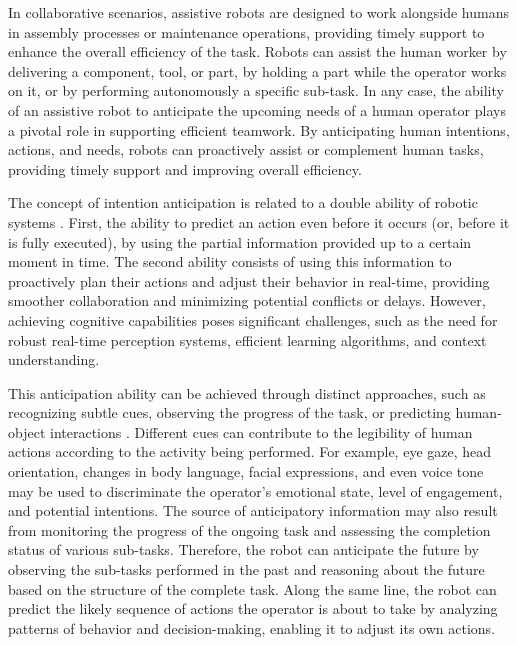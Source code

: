 In collaborative scenarios, assistive robots are designed to work alongside humans in assembly processes or maintenance operations, providing timely support to enhance the overall efficiency of the task. Robots can assist the human worker by delivering a component, tool, or part, by holding a part while the operator works on it, or by performing autonomously a specific sub-task. In any case, the ability of an assistive robot to anticipate the upcoming needs of a human operator plays a pivotal role in supporting efficient teamwork. By anticipating human intentions, actions, and needs, robots can proactively assist or complement human tasks, providing timely support and improving overall efficiency. 

The concept of intention anticipation is related to a double ability of robotic systems \cite{Hoffman2007,Williams2009,Huang2016,Duarte2018}. First, the ability to predict an action even before it occurs (or, before it is fully executed), by using the partial information provided up to a certain moment in time. The second ability consists of using this information to proactively plan their actions and adjust their behavior in real-time, providing smoother collaboration and minimizing potential conflicts or delays. However, achieving cognitive capabilities poses significant challenges, such as the need for robust real-time perception systems, efficient learning algorithms, and context understanding.

This anticipation ability can be achieved through distinct approaches, such as recognizing subtle cues, observing the progress of the task, or predicting human-object interactions \cite{Williams2009,Huang2015,Gorur2018,Gkioxari2018}. Different cues can contribute to the legibility of human actions according to the activity being performed. For example, eye gaze, head orientation, changes in body language, facial expressions, and even voice tone may be used to discriminate the operator's emotional state, level of engagement, and potential intentions. The source of anticipatory information may also result from monitoring the progress of the ongoing task and assessing the completion status of various sub-tasks. Therefore, the robot can anticipate the future by observing the sub-tasks performed in the past and reasoning about the future based on the structure of the complete task. Along the same line, the robot can predict the likely sequence of actions the operator is about to take by analyzing patterns of behavior and decision-making, enabling it to adjust its own actions.

